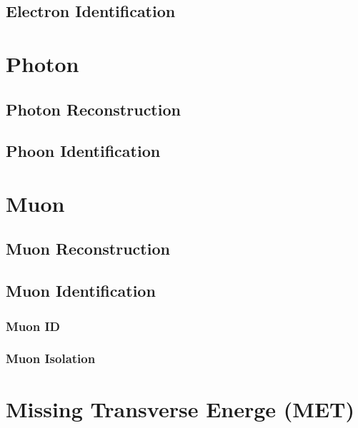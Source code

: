 \subsection{Electron Identification}
\section{Photon}
\subsection{Photon Reconstruction}
\subsection{Phoon Identification}
\section{Muon}
\subsection{Muon Reconstruction}\label{sec:muonrecon}
\subsection{Muon Identification}
\subsubsection{Muon ID}
\subsubsection{Muon Isolation}
\section{Missing Transverse Energe (MET)}
